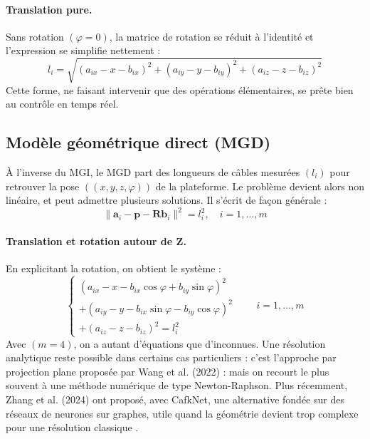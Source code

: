 \paragraph{Translation pure.}
Sans rotation $(\varphi = 0)$, la matrice de rotation se réduit à l'identité et l'expression se simplifie nettement :
\begin{equation}
l_i = \sqrt{(a_{ix}-x-b_{ix})^2 + (a_{iy}-y-b_{iy})^2 + (a_{iz}-z-b_{iz})^2}
\label{eq:li_pure}
\end{equation}
Cette forme, ne faisant intervenir que des opérations élémentaires, se prête bien au contrôle en temps réel.

\subsection{Modèle géométrique direct (MGD)}

À l'inverse du MGI, le MGD part des longueurs de câbles mesurées $(l_i)$ pour retrouver la pose $((x,y,z,\varphi))$ de la plateforme. Le problème devient alors non linéaire, et peut admettre plusieurs solutions. Il s'écrit de façon générale :
\begin{equation}
\|\mathbf{a}_i - \mathbf{p} - \mathbf{R}\mathbf{b}_i\|^2 = l_i^2, \quad i = 1, \dots, m
\label{eq:mgd}
\end{equation}

\paragraph{Translation et rotation autour de Z.}
En explicitant la rotation, on obtient le système :
\begin{equation}
\begin{cases}
(a_{ix}-x-b_{ix}\cos\varphi+b_{iy}\sin\varphi)^2 \\
+(a_{iy}-y-b_{ix}\sin\varphi-b_{iy}\cos\varphi)^2 \\
+(a_{iz}-z-b_{iz})^2 = l_i^2
\end{cases}
\qquad i = 1, \dots, m
\end{equation}
Avec $(m = 4)$, on a autant d'équations que d'inconnues. Une résolution analytique reste possible dans certains cas particuliers : c'est l'approche par projection plane proposée par Wang et al. (2022) \cite{mdpi2022} : mais on recourt le plus souvent à une méthode numérique de type Newton-Raphson. Plus récemment, Zhang et al. (2024) ont proposé, avec CafkNet, une alternative fondée sur des réseaux de neurones sur graphes, utile quand la géométrie devient trop complexe pour une résolution classique \cite{zhang2024}.

